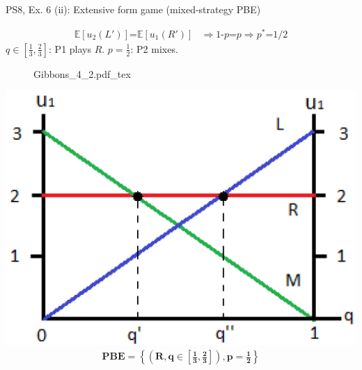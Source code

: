 \begin{frame}{PS8, Ex. 6 (ii): Extensive form game (mixed-strategy PBE)}
\begin{multicols}{2}
      \begin{align*}
        \mathbb{E}[u_2(L')]\text{=}\mathbb{E}[u_1(R')]&\Rightarrow \text{1-}p\text{=}p\Rightarrow p^*\text{=}1/2
      \end{align*}
      $q\in$$\left[\frac{1}{3},\frac{2}{3}\right]$: P1 plays $R$. $p=\frac{1}{2}$: P2 mixes.
      \vfill\null\columnbreak
      \begin{figure}[!h]
        \center {}
        {Gibbons_4_2.pdf_tex}
      \end{figure}
      \includegraphics[width=1.1\columnwidth]{figures/Gibbons_4_2_E[u]}
      \vspace{-16pt}
      \begin{align*}
        \bm{PBE=\left\{\left(R,q\in\left[\frac{1}{3},\frac{2}{3}\right]\right),p=\frac{1}{2}\right\}}
      \end{align*}
      \vfill\null
    \end{multicols}
\end{frame}
